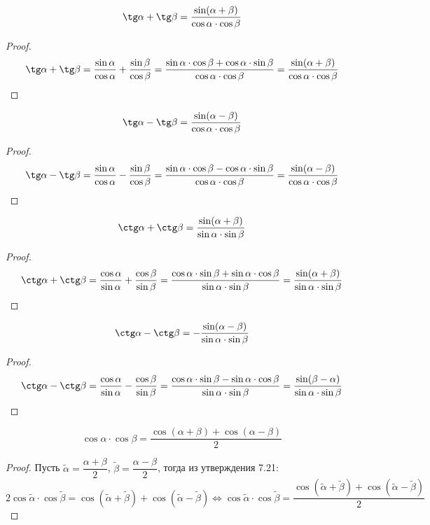 \documentclass[12pt]{article}
\begin{document}
    \begin{statement}
        $$\tg\alpha+\tg\beta=\dfrac{\sin(\alpha+\beta)}{\cos\alpha\cdot\cos\beta}$$
    \end{statement}
    \begin{proof}
        $$\tg\alpha+\tg\beta=\dfrac{\sin\alpha}{\cos\alpha}+\dfrac{\sin\beta}{\cos\beta}=\dfrac{\sin\alpha\cdot\cos\beta+\cos\alpha\cdot\sin\beta}{\cos\alpha\cdot\cos\beta}=\dfrac{\sin(\alpha+\beta)}{\cos\alpha\cdot\cos\beta}$$
    \end{proof}
    \begin{statement}
        $$\tg\alpha-\tg\beta=\dfrac{\sin(\alpha-\beta)}{\cos\alpha\cdot\cos\beta}$$
    \end{statement}
    \begin{proof}
        $$\tg\alpha-\tg\beta=\dfrac{\sin\alpha}{\cos\alpha}-\dfrac{\sin\beta}{\cos\beta}=\dfrac{\sin\alpha\cdot\cos\beta-\cos\alpha\cdot\sin\beta}{\cos\alpha\cdot\cos\beta}=\dfrac{\sin(\alpha-\beta)}{\cos\alpha\cdot\cos\beta}$$
    \end{proof}
    \begin{statement}
        $$\ctg\alpha+\ctg\beta=\dfrac{\sin(\alpha+\beta)}{\sin\alpha\cdot\sin\beta}$$
    \end{statement}
    \begin{proof}
        $$\ctg\alpha+\ctg\beta=\dfrac{\cos\alpha}{\sin\alpha}+\dfrac{\cos\beta}{\sin\beta}=\dfrac{\cos\alpha\cdot\sin\beta+\sin\alpha\cdot\cos\beta}{\sin\alpha\cdot\sin\beta}=\dfrac{\sin(\alpha+\beta)}{\sin\alpha\cdot\sin\beta}$$
    \end{proof}
    \begin{statement}
        $$\ctg\alpha-\ctg\beta=-\dfrac{\sin(\alpha-\beta)}{\sin\alpha\cdot\sin\beta}$$
    \end{statement}
    \begin{proof}
        $$\ctg\alpha-\ctg\beta=\dfrac{\cos\alpha}{\sin\alpha}-\dfrac{\cos\beta}{\sin\beta}=\dfrac{\cos\alpha\cdot\sin\beta-\sin\alpha\cdot\cos\beta}{\sin\alpha\cdot\sin\beta}=\dfrac{\sin(\beta-\alpha)}{\sin\alpha\cdot\sin\beta}$$
    \end{proof}
    \begin{statement}
        $$\cos\alpha\cdot\cos\beta=\dfrac{\cos(\alpha+\beta)+\cos(\alpha-\beta)}{2}$$
    \end{statement}
    \begin{proof}
        Пусть $\tilde{\alpha} = \dfrac{\alpha+\beta}{2}$, $\tilde{\beta} = \dfrac{\alpha-\beta}{2}$, тогда из утверждения 7.21:
        $$2\cos\tilde{\alpha}\cdot\cos\tilde{\beta}=\cos(\tilde{\alpha}+\tilde{\beta})+\cos(\tilde{\alpha}-\tilde{\beta})\Longleftrightarrow \cos\tilde{\alpha}\cdot\cos\tilde{\beta}=\dfrac{\cos(\tilde{\alpha}+\tilde{\beta})+\cos(\tilde{\alpha}-\tilde{\beta})}{2}$$
    \end{proof}
\end{document}
